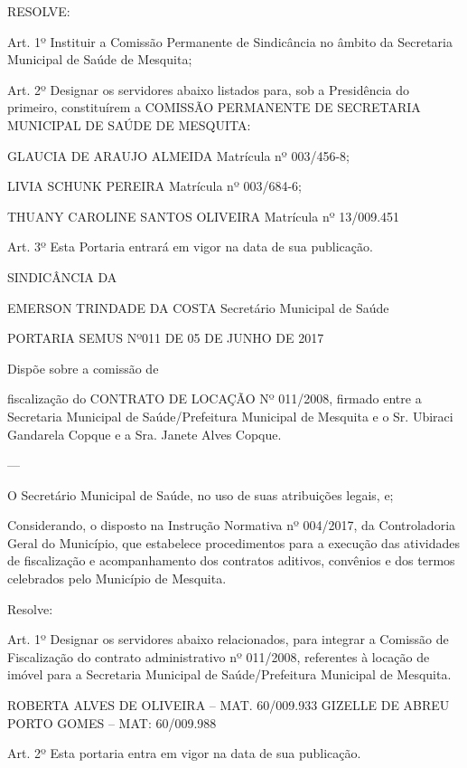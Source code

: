 \documentclass{doliberto}
\begin{document}
RESOLVE: 
 
Art. 1º Instituir a Comissão Permanente de Sindicância  no 
âmbito da Secretaria Municipal de Saúde de Mesquita;  
 
Art.  2º  Designar  os  servidores  abaixo  listados  para,  sob  a 
Presidência  do  primeiro,  constituírem  a  COMISSÃO 
PERMANENTE  DE 
SECRETARIA 
MUNICIPAL DE SAÚDE DE MESQUITA:  
 
GLAUCIA DE ARAUJO ALMEIDA 
Matrícula nº 003/456-8; 
 
LIVIA SCHUNK PEREIRA 
Matrícula nº 003/684-6; 
 
THUANY CAROLINE SANTOS OLIVEIRA 
Matrícula nº 13/009.451 
 
Art.  3º  Esta  Portaria  entrará  em  vigor  na  data  de  sua 
publicação. 
 
 

SINDICÂNCIA  DA 

EMERSON TRINDADE DA COSTA 
Secretário Municipal de Saúde 

 PORTARIA SEMUS Nº011 DE 05 DE JUNHO DE 2017 

Dispõe  sobre  a  comissão  de 
 
fiscalização  do 
CONTRATO  DE  LOCAÇÃO  Nº  011/2008,  firmado  entre  a 
Secretaria  Municipal  de  Saúde/Prefeitura  Municipal  de 
Mesquita  e  o  Sr.  Ubiraci  Gandarela  Copque  e  a  Sra.  Janete 
Alves Copque. 

---

O  Secretário  Municipal  de  Saúde,  no  uso  de  suas 
atribuições legais, e; 
 
        
Considerando, o disposto na Instrução Normativa 
nº  004/2017,  da  Controladoria  Geral  do  Município,  que 
estabelece procedimentos para a execução das atividades de 
fiscalização  e  acompanhamento  dos  contratos  aditivos, 
convênios  e  dos  termos  celebrados  pelo  Município  de 
Mesquita.  
 
Resolve:  
 
Art.  1º  Designar  os  servidores  abaixo  relacionados,  para 
integrar  a  Comissão  de  Fiscalização  do  contrato 
administrativo nº 011/2008, referentes à locação de imóvel 
para a Secretaria Municipal de Saúde/Prefeitura Municipal 
de Mesquita. 
 
ROBERTA ALVES DE OLIVEIRA – MAT. 60/009.933 
GIZELLE DE ABREU PORTO GOMES – MAT: 60/009.988 
 
 
Art.  2º  Esta  portaria  entra  em  vigor  na  data  de  sua 
publicação. 
 
 
\end{document}
